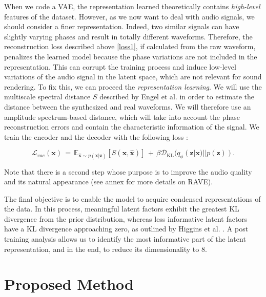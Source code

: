 \documentclass{article}
\begin{document}
When we code a VAE, the representation learned theoretically contains \textit{high-level} features of the dataset. However, as we now want to deal with audio signals, we should consider a 
finer representation. Indeed, two similar signals can have slightly varying phases and result in totally different waveforms. Therefore, the reconstruction loss described above \ref{loss1}, if calculated from the raw waveform, penalizes the learned model because the phase variations are not included in the representation. This can corrupt the training process and induce low-level variations of the audio signal in the latent space, which are not relevant for sound rendering. To fix this, we can proceed the \textit{representation learning}. We will use the multiscale spectral distance $S$ described by Engel et al. \cite{engelDDSPDifferentiableDigital2020} in order to estimate the distance between the synthesized and real waveforms. We will therefore use an amplitude spectrum-based distance, which will take into account the phase reconstruction errors and contain the characteristic information of the signal.
We train the encoder and the decoder with the following loss :

\begin{equation}
    \mathcal{L}_{vae} (\textbf{x}) \,=\, \mathbb{E}_{\bm\hat{\textbf{x}} \sim p(\textbf{x}|\textbf{z})}[S(\textbf{x},\bm\hat {\textbf{x}})] \,+\, \beta \mathcal{D}_{\text{KL}}(q_\phi (\textbf{z}|\textbf{x})||p(\textbf{z})).
\end{equation}

Note that there is a second step whose purpose is to improve the audio quality and its natural appearance (see annex for more details on RAVE).



The final objective is to enable the model to acquire condensed representations of the data. In this process, meaningful latent factors exhibit the greatest KL divergence from the prior distribution, whereas less informative latent factors have a KL divergence approaching zero, as outlined by Higgins et al. \cite{higginsVVAELEARNINGBASIC2017}. A post training analysis allows us to identify the most informative part of  the latent representation, and in the end, to reduce its dimensionality to $8$.





\section{Proposed Method}
\end{document}
